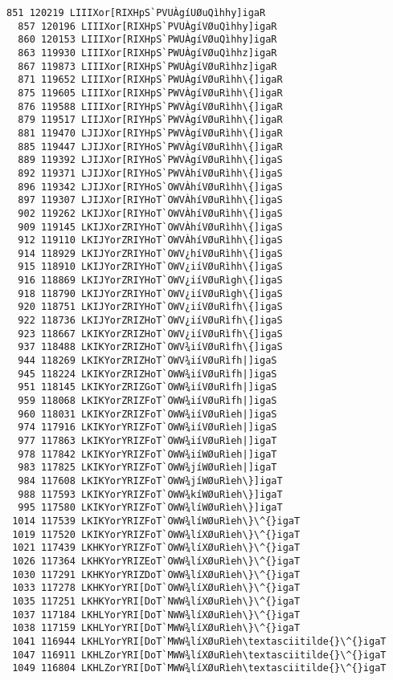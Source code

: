 \documentclass[11pt]{article}
\begin{document}
\begin{Verbatim}[commandchars=\\\{\}]
  851 120219 LIIIXor[RIXHpS`PVUÀgíUØuQìhhy]igaR
  857 120196 LIIIXor[RIXHpS`PVUÀgíVØuQìhhy]igaR
  860 120153 LIIIXor[RIXHpS`PWUÀgíVØuQìhhy]igaR
  863 119930 LIIIXor[RIXHpS`PWUÀgíVØuQìhhz]igaR
  867 119873 LIIIXor[RIXHpS`PWUÀgíVØuRìhhz]igaR
  871 119652 LIIIXor[RIXHpS`PWUÀgíVØuRìhh\{]igaR
  875 119605 LIIIXor[RIXHpS`PWVÀgíVØuRìhh\{]igaR
  876 119588 LIIIXor[RIYHpS`PWVÀgíVØuRìhh\{]igaR
  879 119517 LIIJXor[RIYHpS`PWVÀgíVØuRìhh\{]igaR
  881 119470 LJIJXor[RIYHpS`PWVÀgíVØuRìhh\{]igaR
  885 119447 LJIJXor[RIYHoS`PWVÀgíVØuRìhh\{]igaR
  889 119392 LJIJXor[RIYHoS`PWVÀgíVØuRìhh\{]igaS
  892 119371 LJIJXor[RIYHoS`PWVÀhíVØuRìhh\{]igaS
  896 119342 LJIJXor[RIYHoS`OWVÀhíVØuRìhh\{]igaS
  897 119307 LJIJXor[RIYHoT`OWVÀhíVØuRìhh\{]igaS
  902 119262 LKIJXor[RIYHoT`OWVÀhíVØuRìhh\{]igaS
  909 119145 LKIJXorZRIYHoT`OWVÀhíVØuRìhh\{]igaS
  912 119110 LKIJYorZRIYHoT`OWVÀhíVØuRìhh\{]igaS
  914 118929 LKIJYorZRIYHoT`OWV¿híVØuRìhh\{]igaS
  915 118910 LKIJYorZRIYHoT`OWV¿iíVØuRìhh\{]igaS
  916 118869 LKIJYorZRIYHoT`OWV¿iíVØuRìgh\{]igaS
  918 118790 LKIJYorZRIYHoT`OWV¿iíVØuRìgh\{]igaS
  920 118751 LKIJYorZRIYHoT`OWV¿iíVØuRìfh\{]igaS
  922 118736 LKIJYorZRIZHoT`OWV¿iíVØuRìfh\{]igaS
  923 118667 LKIKYorZRIZHoT`OWV¿iíVØuRìfh\{]igaS
  937 118488 LKIKYorZRIZHoT`OWV¾iíVØuRìfh\{]igaS
  944 118269 LKIKYorZRIZHoT`OWV¾iíVØuRìfh|]igaS
  945 118224 LKIKYorZRIZHoT`OWW¾iíVØuRìfh|]igaS
  951 118145 LKIKYorZRIZGoT`OWW¾iíVØuRìfh|]igaS
  959 118068 LKIKYorZRIZFoT`OWW¾iíVØuRìfh|]igaS
  960 118031 LKIKYorZRIZFoT`OWW¾iíVØuRìeh|]igaS
  974 117916 LKIKYorYRIZFoT`OWW¾iíVØuRìeh|]igaS
  977 117863 LKIKYorYRIZFoT`OWW¾iíVØuRìeh|]igaT
  978 117842 LKIKYorYRIZFoT`OWW¾iíWØuRìeh|]igaT
  983 117825 LKIKYorYRIZFoT`OWW¾jíWØuRìeh|]igaT
  984 117608 LKIKYorYRIZFoT`OWW¾jíWØuRìeh\}]igaT
  988 117593 LKIKYorYRIZFoT`OWW¾kíWØuRìeh\}]igaT
  995 117580 LKIKYorYRIZFoT`OWW¾líWØuRìeh\}]igaT
 1014 117539 LKIKYorYRIZFoT`OWW¾líWØuRìeh\}\^{}igaT
 1019 117520 LKIKYorYRIZFoT`OWW¾líXØuRìeh\}\^{}igaT
 1021 117439 LKHKYorYRIZFoT`OWW¾líXØuRìeh\}\^{}igaT
 1026 117364 LKHKYorYRIZEoT`OWW¾líXØuRìeh\}\^{}igaT
 1030 117291 LKHKYorYRIZDoT`OWW¾líXØuRìeh\}\^{}igaT
 1033 117278 LKHKYorYRI[DoT`OWW¾líXØuRìeh\}\^{}igaT
 1035 117251 LKHKYorYRI[DoT`NWW¾líXØuRìeh\}\^{}igaT
 1037 117184 LKHLYorYRI[DoT`NWW¾líXØuRìeh\}\^{}igaT
 1038 117159 LKHLYorYRI[DoT`MWW¾líXØuRìeh\}\^{}igaT
 1041 116944 LKHLYorYRI[DoT`MWW¾líXØuRìeh\textasciitilde{}\^{}igaT
 1047 116911 LKHLZorYRI[DoT`MWW¾líXØuRìeh\textasciitilde{}\^{}igaT
 1049 116804 LKHLZorYRI[DoT`MWW¾líXØuRìeh\textasciitilde{}\^{}igaT

\end{Verbatim}
\end{document}
